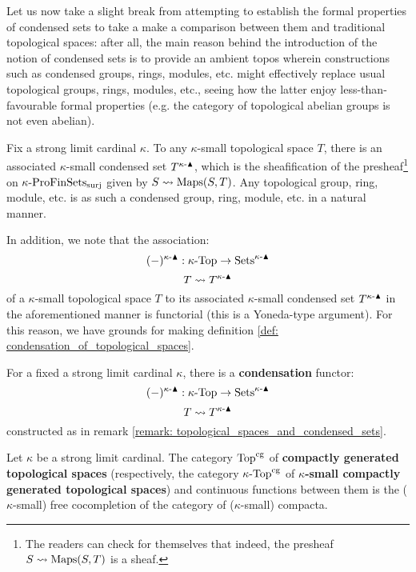             Let us now take a slight break from attempting to establish the formal properties of condensed sets to take a make a comparison between them and traditional topological spaces: after all, the main reason behind the introduction of the notion of condensed sets is to provide an ambient topos wherein constructions such as condensed groups, rings, modules, etc. might effectively replace usual topological groups, rings, modules, etc., seeing how the latter enjoy less-than-favourable formal properties (e.g. the category of topological abelian groups is not even abelian).
            \begin{remark} \label{remark: topological_spaces_and_condensed_sets}
                Fix a strong limit cardinal $\kappa$. To any $\kappa$-small topological space $T$, there is an associated $\kappa$-small condensed set $T^{\kappa\text{-}\blacktriangle}$, which is the sheafification of the presheaf\footnote{The readers can check for themselves that indeed, the presheaf $S \leadsto \mathrm{Maps}(S, T)$ is a sheaf.} on $\kappa\text{-}\mathrm{Pro}\mathrm{Fin}\mathrm{Sets}_{\mathrm{surj}}$ given by $S \leadsto \mathrm{Maps}(S, T)$. Any topological group, ring, module, etc. is as such a condensed group, ring, module, etc. in a natural manner. 
                
                In addition, we note that the association:
                    $$(-)^{\kappa\text{-}\blacktriangle}: \kappa\text{-}\mathrm{Top} \to \mathrm{Sets}^{\kappa\text{-}\blacktriangle}$$
                    $$T \leadsto T^{\kappa\text{-}\blacktriangle}$$
                of a $\kappa$-small topological space $T$ to its associated $\kappa$-small condensed set $T^{\kappa\text{-}\blacktriangle}$ in the aforementioned manner is functorial (this is a Yoneda-type argument). For this reason, we have grounds for making definition \ref{def: condensation_of_topological_spaces}. 
            \end{remark}
            \begin{definition}[Condensation] \label{def: condensation_of_topological_spaces}
                For a fixed a strong limit cardinal $\kappa$, there is a \textbf{condensation} functor:
                    $$(-)^{\kappa\text{-}\blacktriangle}: \kappa\text{-}\mathrm{Top} \to \mathrm{Sets}^{\kappa\text{-}\blacktriangle}$$
                    $$T \leadsto T^{\kappa\text{-}\blacktriangle}$$
                constructed as in remark \ref{remark: topological_spaces_and_condensed_sets}.
            \end{definition}
            \begin{definition} \label{def: compactly_generated_topological_spaces}
                Let $\kappa$ be a strong limit cardinal. The category $\mathrm{Top}^{\mathrm{cg}}$ of \textbf{compactly generated topological spaces} (respectively, the category $\kappa\text{-}\mathrm{Top}^{\mathrm{cg}}$ of \textbf{$\kappa$-small compactly generated topological spaces}) and continuous functions between them is the ($\kappa$-small) free cocompletion of the category of ($\kappa$-small) compacta. 
            \end{definition}
